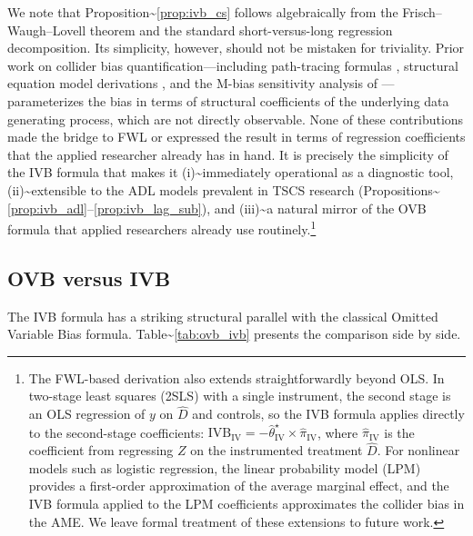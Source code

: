 \documentclass[
]{article}
\begin{document}
We note that Proposition\textasciitilde{}\ref{prop:ivb_cs} follows
algebraically from the Frisch--Waugh--Lovell theorem and the standard
short-versus-long regression decomposition. Its simplicity, however,
should not be mistaken for triviality. Prior work on collider bias
quantification---including path-tracing formulas
\citep{pearl2013linear}, structural equation model derivations
\citep{greenland2003quantifying}, and the M-bias sensitivity analysis of
\citet{ding2015adjust}---parameterizes the bias in terms of structural
coefficients of the underlying data generating process, which are not
directly observable. None of these contributions made the bridge to FWL
or expressed the result in terms of regression coefficients that the
applied researcher already has in hand. It is precisely the simplicity
of the IVB formula that makes it (i)\textasciitilde immediately
operational as a diagnostic tool, (ii)\textasciitilde extensible to the
ADL models prevalent in TSCS research
(Propositions\textasciitilde{}\ref{prop:ivb_adl}--\ref{prop:ivb_lag_sub}),
and (iii)\textasciitilde a natural mirror of the OVB formula that
applied researchers already use
routinely.\footnote{The FWL-based derivation also extends straightforwardly beyond OLS. In two-stage least squares (2SLS) with a single instrument, the second stage is an OLS regression of $y$ on $\hat{D}$ and controls, so the IVB formula applies directly to the second-stage coefficients: $\text{IVB}_{\text{IV}} = -\hat\theta^{\star}_{\text{IV}} \times \hat\pi_{\text{IV}}$, where $\hat\pi_{\text{IV}}$ is the coefficient from regressing $Z$ on the instrumented treatment $\hat{D}$. For nonlinear models such as logistic regression, the linear probability model (LPM) provides a first-order approximation of the average marginal effect, and the IVB formula applied to the LPM coefficients approximates the collider bias in the AME. We leave formal treatment of these extensions to future work.}

\subsection{\texorpdfstring{OVB versus IVB
\label{sec:ovb_vs_ivb}}{OVB versus IVB }}\label{ovb-versus-ivb}

The IVB formula has a striking structural parallel with the classical
Omitted Variable Bias formula. Table\textasciitilde{}\ref{tab:ovb_ivb}
presents the comparison side by side.
\end{document}
